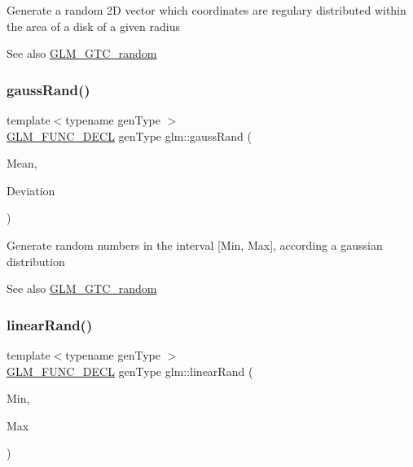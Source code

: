 Generate a random 2D vector which coordinates are regulary distributed within the area of a disk of a given radius

\begin{DoxySeeAlso}{See also}
\mbox{\hyperlink{group__gtc__random}{G\+L\+M\+\_\+\+G\+T\+C\+\_\+random}} 
\end{DoxySeeAlso}
\mbox{\label{group__gtc__random_ga5193a83e49e4fdc5652c084711083574}} 
\subsubsection{\texorpdfstring{gauss\+Rand()}{gaussRand()}}
{\footnotesize\ttfamily template$<$typename gen\+Type $>$ \\
\mbox{\hyperlink{setup_8hpp_ab2d052de21a70539923e9bcbf6e83a51}{G\+L\+M\+\_\+\+F\+U\+N\+C\+\_\+\+D\+E\+CL}} gen\+Type glm\+::gauss\+Rand (\begin{DoxyParamCaption}\item[{gen\+Type}]{Mean,  }\item[{gen\+Type}]{Deviation }\end{DoxyParamCaption})}

Generate random numbers in the interval \mbox{[}Min, Max\mbox{]}, according a gaussian distribution

\begin{DoxySeeAlso}{See also}
\mbox{\hyperlink{group__gtc__random}{G\+L\+M\+\_\+\+G\+T\+C\+\_\+random}} 
\end{DoxySeeAlso}
\mbox{\label{group__gtc__random_ga04e241ab88374a477a2c2ceadd2fa03d}} 
\subsubsection{\texorpdfstring{linear\+Rand()}{linearRand()}\hspace{0.1cm}{\footnotesize\ttfamily [1/2]}}
{\footnotesize\ttfamily template$<$typename gen\+Type $>$ \\
\mbox{\hyperlink{setup_8hpp_ab2d052de21a70539923e9bcbf6e83a51}{G\+L\+M\+\_\+\+F\+U\+N\+C\+\_\+\+D\+E\+CL}} gen\+Type glm\+::linear\+Rand (\begin{DoxyParamCaption}\item[{gen\+Type}]{Min,  }\item[{gen\+Type}]{Max }\end{DoxyParamCaption})}

